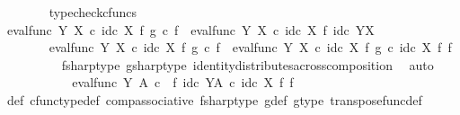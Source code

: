 \begin{isabellebody}
\ \ \ \ \ \ \isamarkupfalse%
\ typecheck{\isacharunderscore}{\kern0pt}cfuncs\isanewline
\ \ \ \ \isamarkupfalse%
\ {\isachardoublequoteopen}eval{\isacharunderscore}{\kern0pt}func\ Y\ X\ {\isasymcirc}\isactrlsub c\ id\isactrlsub c\ X\ {\isasymtimes}\isactrlsub f\ g\isactrlsup {\isasymsharp}\ {\isasymcirc}\isactrlsub c\ f\isactrlsup {\isasymsharp}\ {\isacharequal}{\kern0pt}\ eval{\isacharunderscore}{\kern0pt}func\ Y\ X\ {\isasymcirc}\isactrlsub c\ id\isactrlsub c\ X\ {\isasymtimes}\isactrlsub f\ id\isactrlsub c\ {\isacharparenleft}{\kern0pt}Y\isactrlbsup X\isactrlesup {\isacharparenright}{\kern0pt}{\isachardoublequoteclose}\isanewline
\ \ \ \ \isamarkupfalse%
\ {\isacharminus}{\kern0pt}\ \isanewline
\ \ \ \ \ \ \isamarkupfalse%
\ {\isachardoublequoteopen}eval{\isacharunderscore}{\kern0pt}func\ Y\ X\ {\isasymcirc}\isactrlsub c\ id\isactrlsub c\ X\ {\isasymtimes}\isactrlsub f\ g\isactrlsup {\isasymsharp}\ {\isasymcirc}\isactrlsub c\ f\isactrlsup {\isasymsharp}\ {\isacharequal}{\kern0pt}\ eval{\isacharunderscore}{\kern0pt}func\ Y\ X\ {\isasymcirc}\isactrlsub c\ {\isacharparenleft}{\kern0pt}id\isactrlsub c\ X\ {\isasymtimes}\isactrlsub f\ g\isactrlsup {\isasymsharp}{\isacharparenright}{\kern0pt}\ {\isasymcirc}\isactrlsub c\ {\isacharparenleft}{\kern0pt}id\isactrlsub c\ X\ {\isasymtimes}\isactrlsub f\ f\isactrlsup {\isasymsharp}{\isacharparenright}{\kern0pt}{\isachardoublequoteclose}\isanewline
\ \ \ \ \ \ \ \ \isamarkupfalse%
\ fsharp{\isacharunderscore}{\kern0pt}type\ gsharp{\isacharunderscore}{\kern0pt}type\ identity{\isacharunderscore}{\kern0pt}distributes{\isacharunderscore}{\kern0pt}across{\isacharunderscore}{\kern0pt}composition\ \isamarkupfalse%
\ auto\isanewline
\ \ \ \ \ \ \isamarkupfalse%
\ \isamarkupfalse%
\ {\isachardoublequoteopen}{\isachardot}{\kern0pt}{\isachardot}{\kern0pt}{\isachardot}{\kern0pt}\ {\isacharequal}{\kern0pt}\ eval{\isacharunderscore}{\kern0pt}func\ Y\ A\ {\isasymcirc}\isactrlsub c\ {\isacharparenleft}{\kern0pt}{\isasymphi}\ {\isasymtimes}\isactrlsub f\ id\isactrlsub c\ {\isacharparenleft}{\kern0pt}Y\isactrlbsup A\isactrlesup {\isacharparenright}{\kern0pt}{\isacharparenright}{\kern0pt}\ {\isasymcirc}\isactrlsub c\ {\isacharparenleft}{\kern0pt}id\isactrlsub c\ X\ {\isasymtimes}\isactrlsub f\ f\isactrlsup {\isasymsharp}{\isacharparenright}{\kern0pt}{\isachardoublequoteclose}\isanewline
\ \ \ \ \ \ \ \ \isamarkupfalse%
\ {\isasymphi}{\isacharunderscore}{\kern0pt}def\ cfunc{\isacharunderscore}{\kern0pt}type{\isacharunderscore}{\kern0pt}def\ comp{\isacharunderscore}{\kern0pt}associative\ fsharp{\isacharunderscore}{\kern0pt}type\ g{\isacharunderscore}{\kern0pt}def\ g{\isacharunderscore}{\kern0pt}type\ transpose{\isacharunderscore}{\kern0pt}func{\isacharunderscore}{\kern0pt}def\ \isamarkupfalse%

\end{isabellebody}
